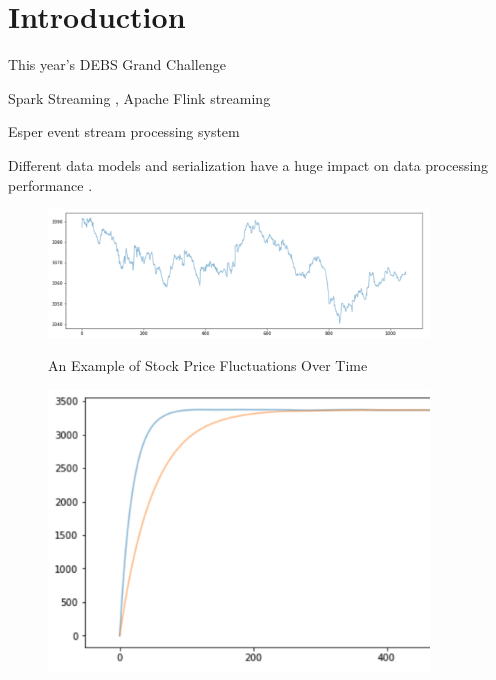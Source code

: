 
\section{Introduction}


This year's DEBS Grand Challenge \cite{debs2022challenge}









Spark Streaming \cite{zaharia2010spark}, Apache Flink streaming \cite{alexandrov2014stratosphere}

Esper event stream processing system \cite{Bernhardt2007}


Different data models and serialization have a huge impact on data processing performance \cite{DBLP:conf/cloud/SikdarTJ17}. 




\begin{figure}[!ht]
    \begin{center}
        \includegraphics[width=0.9\textwidth]{./images/stock_example.png}
        \label{fig:stock}
        \caption{An Example of Stock Price Fluctuations Over Time}
    \end{center}
\end{figure}



\begin{figure}[!ht]
    \begin{center}
        \includegraphics[width=0.9\textwidth]{./images/query2_example_200.png}
        \label{fig:EMA200}
        \caption{ }
    \end{center}
\end{figure}



